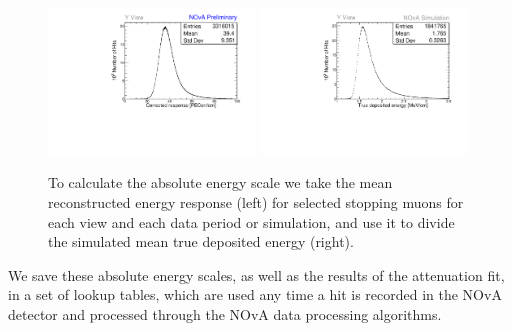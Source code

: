 \begin{figure}
    \centering
    \includegraphics[width=0.49\textwidth]{Plots/NOvAExperiment/ExampleAbsCalib_P4_meu_y.pdf}
    \includegraphics[width=0.49\textwidth]{Plots/NOvAExperiment/ExampleAbsCalib_Sim_mev_y.pdf}
    \caption[Example distributions for the NOvA absolute calibration]{To calculate the absolute energy scale we take the mean reconstructed energy response (left) for selected stopping muons for each view and each data period or simulation, and use it to divide the simulated mean true deposited energy (right).}
    \label{fig:NOvACalibrationAbsoluteEnergyScale}
\end{figure}


We save these absolute energy scales, as well as the results of the attenuation fit, in a set of lookup tables, which are used any time a hit is recorded in the NOvA detector and processed through the NOvA data processing algorithms.


